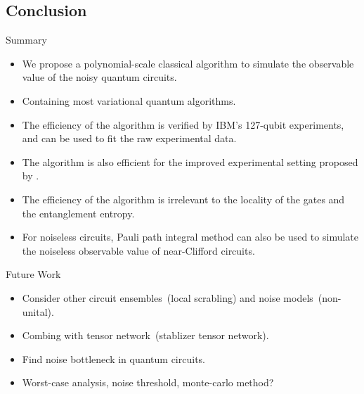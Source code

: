 \documentclass[10pt]{beamer}
\begin{document}
\begin{CJK}{UTF8}{gbsn}
\section{Conclusion}

\begin{frame}[fragile]{Summary}
  \begin{itemize}
    \item We propose a polynomial-scale classical algorithm to simulate the observable value of the noisy quantum circuits.
    \item  Containing most variational quantum algorithms.
    \item The efficiency of the algorithm is verified by IBM's 127-qubit experiments, and can be used to fit the raw experimental data.
    \item The algorithm is also efficient for the improved experimental setting proposed by \cite{anand2023classical}.
    \item The efficiency of the algorithm is irrelevant to the locality of the gates and the entanglement entropy. 
    \item For noiseless circuits, Pauli path integral method can also be used to simulate the noiseless observable value of near-Clifford circuits.
  \end{itemize}
\end{frame}


\begin{frame}[fragile]{Future Work}
  \begin{itemize}
    \item Consider other circuit ensembles~(local scrabling) and noise models~(non-unital).
    \item Combing with tensor network~(stablizer tensor network).
    \item Find noise bottleneck in quantum circuits.
    \item Worst-case analysis, noise threshold, monte-carlo method?
  \end{itemize}
\end{frame}
\end{CJK}
\end{document}
